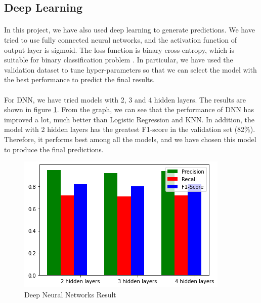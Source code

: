 \documentclass[fleqn,11pt]{olplainarticle}
\begin{document}



\subsection{Deep Learning}\label{dnn}
\paragraph*{}
In this project, we have also used deep learning to generate predictions. We have tried to use fully connected neural networks, and the activation function of output layer is sigmoid. The loss function is binary cross-entropy, which is suitable for binary classification problem \citep{tensorflow2015-whitepaper}. In particular, we have used the validation dataset to tune hyper-parameters so that we can select the model with the best performance to predict the final results.
\paragraph*{}
For DNN, we have tried models with 2, 3 and 4 hidden layers. The results are shown in figure \ref{fig:res}. From the graph, we can see that the performance of DNN has improved a lot, much better than Logistic Regression and KNN. In addition, the model with 2 hidden layers has the greatest F1-score in the validation set (82\%). Therefore, it performs best among all the models, and we have chosen this model to produce the final predictions.
\begin{figure}[H]
	\centering
	\includegraphics[scale=0.3]{result.png}
	\caption{Deep Neural Networks Result}
	\label{fig:res}
\end{figure}
\end{document}
